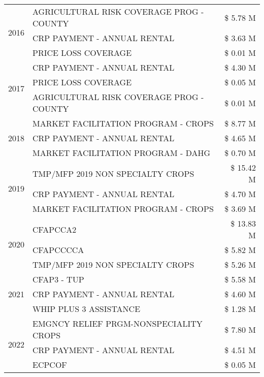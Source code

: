 \begin{tabular}{llr}
\cline{1-3}
\multirow[t]{3}{*}{2016} & AGRICULTURAL RISK COVERAGE PROG - COUNTY & \$ 5.78 M \\
 & CRP PAYMENT - ANNUAL RENTAL & \$ 3.63 M \\
 & PRICE LOSS COVERAGE & \$ 0.01 M \\
\cline{1-3}
\multirow[t]{3}{*}{2017} & CRP PAYMENT - ANNUAL RENTAL & \$ 4.30 M \\
 & PRICE LOSS COVERAGE & \$ 0.05 M \\
 & AGRICULTURAL RISK COVERAGE PROG - COUNTY & \$ 0.01 M \\
\cline{1-3}
\multirow[t]{3}{*}{2018} & MARKET FACILITATION PROGRAM - CROPS & \$ 8.77 M \\
 & CRP PAYMENT - ANNUAL RENTAL & \$ 4.65 M \\
 & MARKET FACILITATION PROGRAM - DAHG & \$ 0.70 M \\
\cline{1-3}
\multirow[t]{3}{*}{2019} & TMP/MFP 2019 NON SPECIALTY CROPS & \$ 15.42 M \\
 & CRP PAYMENT - ANNUAL RENTAL & \$ 4.70 M \\
 & MARKET FACILITATION PROGRAM - CROPS & \$ 3.69 M \\
\cline{1-3}
\multirow[t]{3}{*}{2020} & CFAPCCA2 & \$ 13.83 M \\
 & CFAPCCCCA & \$ 5.82 M \\
 & TMP/MFP 2019 NON SPECIALTY CROPS & \$ 5.26 M \\
\cline{1-3}
\multirow[t]{3}{*}{2021} & CFAP3 - TUP & \$ 5.58 M \\
 & CRP PAYMENT - ANNUAL RENTAL & \$ 4.60 M \\
 & WHIP PLUS 3 ASSISTANCE & \$ 1.28 M \\
\cline{1-3}
\multirow[t]{3}{*}{2022} & EMGNCY RELIEF PRGM-NONSPECIALITY CROPS & \$ 7.80 M \\
 & CRP PAYMENT - ANNUAL RENTAL & \$ 4.51 M \\
 & ECPCOF & \$ 0.05 M \\
\cline{1-3}
\bottomrule
\end{tabular}
